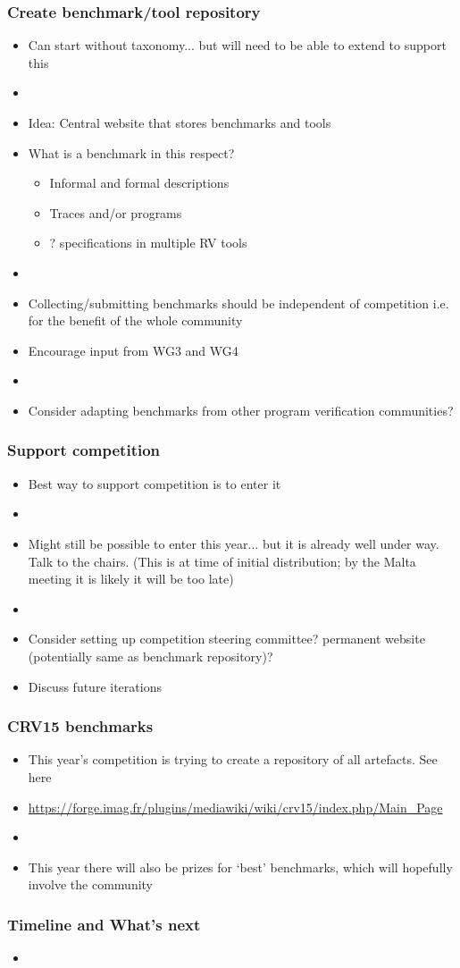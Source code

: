 \documentclass{beamer}
\begin{document}
\begin{frame}
\frametitle{Create benchmark/tool repository}
\begin{itemize}
	\item Can start without taxonomy... but will need to be able to extend to support this
	\item[]
	\item Idea: Central website that stores benchmarks and tools
	\item What is a benchmark in this respect?
	\begin{itemize}
		\item Informal and formal descriptions
		\item Traces and/or programs
		\item ? specifications in multiple RV tools
	\end{itemize}
	\item[]
	\item Collecting/submitting benchmarks should be independent of competition i.e. for the benefit of the whole community
	\item Encourage input from WG3 and WG4
	\item[]
	\item Consider adapting benchmarks from other program verification communities?
\end{itemize}
\end{frame}

\begin{frame}
\frametitle{Support competition}
\begin{itemize}
	\item Best way to support competition is to enter it
	\item[]
	\item Might still be possible to enter this year... but it is already well under way. Talk to the chairs. (This is at time of initial distribution; by the Malta meeting it is likely it will be too late)
	\item[]
	\item Consider setting up competition steering committee? permanent website (potentially same as benchmark repository)?
	\item Discuss future iterations
\end{itemize}
\end{frame}

\begin{frame}
\frametitle{CRV15 benchmarks}
\begin{itemize}
	\item This year's competition is trying to create a repository of all artefacts. See here
	\item[] \url{https://forge.imag.fr/plugins/mediawiki/wiki/crv15/index.php/Main_Page}
	\item[]
	\item This year there will also be prizes for `best' benchmarks, which will hopefully involve the community
\end{itemize}
\end{frame}

\begin{frame}
\frametitle{Timeline and What's next}
\begin{itemize}
	\item
\end{itemize}
\end{frame}
\end{document}
